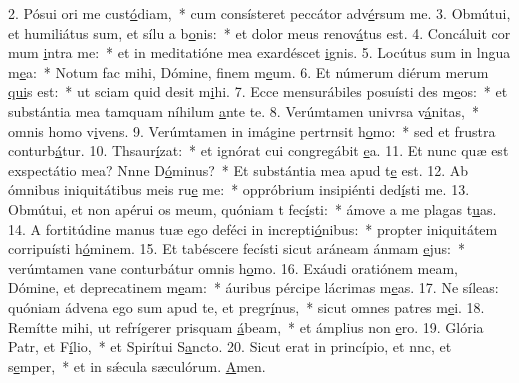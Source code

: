 2. Pósui ori me cust\uline{ó}diam,~* cum consísteret peccátor adv\uline{é}rsum me.
3. Obmútui, et humiliátus sum, et sílu a b\uline{o}nis:~* et dolor meus renov\uline{á}tus est.
4. Concáluit cor mum \uline{i}ntra me:~* et in meditatióne mea exardéscet \uline{i}gnis.
5. Locútus sum in lngua m\uline{e}a:~* Notum fac mihi, Dómine, finem m\uline{e}um.
6. Et númerum diérum merum \uline{qui}s est:~* ut sciam quid desit m\uline{i}hi.
7. Ecce mensurábiles posuísti des m\uline{e}os:~* et substántia mea tamquam níhilum \uline{a}nte te.
8. Verúmtamen univrsa v\uline{á}nitas,~* omnis homo v\uline{i}vens.
9. Verúmtamen in imágine pertrnsit h\uline{o}mo:~* sed et frustra conturb\uline{á}tur.
10. Thsaur\uline{í}zat:~* et ignórat cui congregábit \uline{e}a.
11. Et nunc quæ est exspectátio mea? Nnne D\uline{ó}minus?~* Et substántia mea apud t\uline{e} est.
12. Ab ómnibus iniquitátibus meis ru\uline{e} me:~* oppróbrium insipiénti ded\uline{í}sti me.
13. Obmútui, et non apérui os meum, quóniam t fec\uline{í}sti:~* ámove a me plagas t\uline{u}as.
14. A fortitúdine manus tuæ ego deféci in increpti\uline{ó}nibus:~* propter iniquitátem corripuísti h\uline{ó}minem.
15. Et tabéscere fecísti sicut aráneam ánmam \uline{e}jus:~* verúmtamen vane conturbátur omnis h\uline{o}mo.
16. Exáudi oratiónem meam, Dómine, et deprecatinem m\uline{e}am:~* áuribus pércipe lácrimas m\uline{e}as.
17. Ne síleas: quóniam ádvena ego sum apud te, et pregr\uline{í}nus,~* sicut omnes patres m\uline{e}i.
18. Remítte mihi, ut refrígerer prisquam \uline{á}beam,~* et ámplius non \uline{e}ro.
19. Glória Patr, et F\uline{í}lio,~* et Spirítui S\uline{a}ncto.
20. Sicut erat in princípio, et nnc, et s\uline{e}mper,~* et in sǽcula sæculórum. \uline{A}men.
